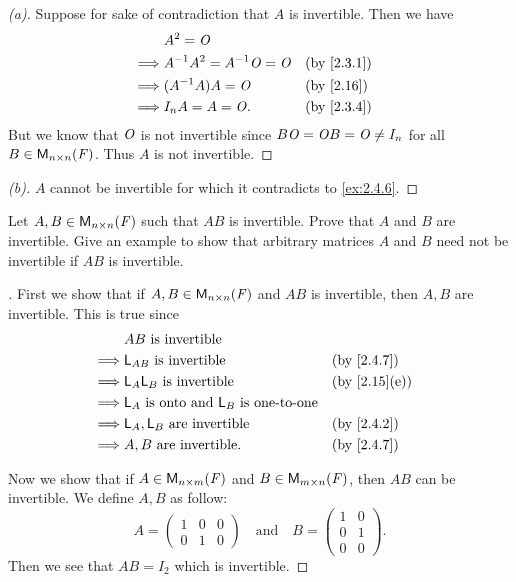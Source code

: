 \begin{proof}[(a)]
	Suppose for sake of contradiction that \(A\) is invertible.
	Then we have
	\begin{align*}
		         & A^2 = \zm                                     \\
		\implies & A^{-1} A^2 = A^{-1} \zm = \zm &  & \by{2.3.1} \\
		\implies & (A^{-1} A) A = \zm            &  & \by{2.16}  \\
		\implies & I_n A = A = \zm.              &  & \by{2.3.4}
	\end{align*}
	But we know that \(\mathit{O}\) is not invertible since \(B \mathit{O} = \mathit{O} B = \mathit{O} \neq I_n\) for all \(B \in \ms[n][n][\F]\).
	Thus \(A\) is not invertible.
\end{proof}

\begin{proof}[(b)]
	\(A\) cannot be invertible for which it contradicts to \cref{ex:2.4.6}.
\end{proof}

\setcounter{ex}{8}
\begin{ex}\label{ex:2.4.9}
	Let \(A, B \in \ms[n][n][\F]\) such that \(AB\) is invertible.
	Prove that \(A\) and \(B\) are invertible.
	Give an example to show that arbitrary matrices \(A\) and \(B\) need not be invertible if \(AB\) is invertible.
\end{ex}

\begin{proof}[]
	First we show that if \(A, B \in \ms[n][n][\F]\) and \(AB\) is invertible, then \(A, B\) are invertible.
	This is true since
	\begin{align*}
		         & AB \text{ is invertible}                                               \\
		\implies & \L_{AB} \text{ is invertible}                        &  & \by{2.4.7}   \\
		\implies & \L_A \L_B \text{ is invertible}                      &  & \by{2.15}[e] \\
		\implies & \L_A \text{ is onto and } \L_B \text{ is one-to-one}                   \\
		\implies & \L_A, \L_B \text{ are invertible}                    &  & \by{2.4.2}   \\
		\implies & A, B \text{ are invertible}.                         &  & \by{2.4.7}
	\end{align*}

	Now we show that if \(A \in \ms[n][m][\F]\) and \(B \in \MS\), then \(AB\) can be invertible.
	We define \(A, B\) as follow:
	\[
		A = \begin{pmatrix}
			1 & 0 & 0 \\
			0 & 1 & 0
		\end{pmatrix} \quad \text{and} \quad B = \begin{pmatrix}
			1 & 0 \\
			0 & 1 \\
			0 & 0
		\end{pmatrix}.
	\]
	Then we see that \(AB = I_2\) which is invertible.
\end{proof}

